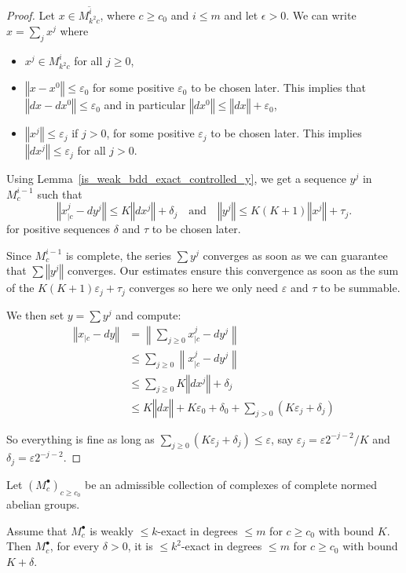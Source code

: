 \begin{proof}
Let $x \in \overline{M^i_{k^2c}}$, where $c \geq c_0$ and $i \leq m$ and let $\epsilon > 0$.
We can write $x = \sum_j x^j$ where
\begin{itemize}
 \item $x^j \in M^i_{k^2c}$ for all $j \geq 0$,
 \item $‖x - x^0‖ ≤ ε_0$ for some positive $ε_0$ to be chosen later. This implies that $‖dx - dx^0‖ ≤ ε_0$ and
   in particular $‖dx^0‖ ≤ ‖dx‖ + ε_0$,
 \item $‖x^j‖ ≤ ε_j$ if $j > 0$, for some positive $ε_j$ to be chosen later. This implies $‖dx^j‖ ≤ ε_j$
   for all $j > 0$.
\end{itemize}

Using Lemma~\ref{is_weak_bdd_exact_controlled_y}, we get a sequence $y^j$ in $M^{i-1}_c$ such that
  \[
    ‖x^j_{|c} - dy^j‖ ≤  K ‖dx^j‖ + δ_j
    \quad \text{and} \quad
    ‖y^j‖ ≤ K(K + 1)‖x^j‖ + τ_j.
  \]
for positive sequences $δ$ and $τ$ to be chosen later.

Since $M^{i-1}_c$ is complete, the series $\sum y^j$ converges as soon as we can guarantee that
$\sum ‖y^j‖$ converges. Our estimates ensure this convergence as soon as the
sum of the $K(K + 1)ε_j + τ_j$ converges so here we only need $ε$ and $τ$ to be
summable.

We then set $y = ∑ y^j$ and compute:
\begin{align*}
  ‖x_{|c} - dy‖ &= \left\|∑_{j ≥ 0} x^j_{|c} - dy^j\right\| \\
    &≤ ∑_{j ≥ 0} \left\|x^j_{|c} - dy^j\right\| \\
    &≤ ∑_{j ≥ 0} K‖dx^j‖ + δ_j \\
    &≤ K‖dx‖ + Kε_0 + δ_0 +  ∑_{j > 0} (Kε_j + δ_j)
\end{align*}

So everything is fine as long as $∑_{j ≥ 0} (Kε_j + δ_j) ≤ ε$, say $ε_j = ε2^{-j-2}/K$ and $δ_j = ε2^{-j-2}$.
\end{proof}

\begin{lemma}
  \label{weakexact_implies_exact}
  \leanok
  Let $(M^\bullet_c)_{c\geq c_0}$ be an admissible collection
  of complexes of complete normed abelian groups.

  Assume that $M^\bullet_c$ is weakly $\leq k$-exact in degrees $\leq m$ for $c\geq c_0$ with bound $K$.
  Then $M^\bullet_c$, for every $δ > 0$, it is $\leq k^2$-exact in degrees $\leq m$ for $c\geq c_0$
  with bound $K+δ$.
\end{lemma}


